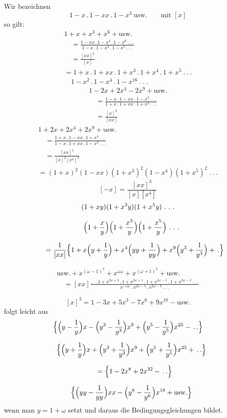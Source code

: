 Wir bezeichnen
\[
1-x\,.\,1-xx\,.\,1-x^3\ \text{usw.}\qquad\text{mit }[x]
\]
so gilt:
\[
\begin{gathered}
1+x+x^3+x^6+\text{usw.}
\\[7pt]\quad{}=\frac{1-xx\,.\,1-x^4\,.\,1-x^6\ .\ .\ .}{1-x\,.\,1-x^3\,.\,1-x^5\ .\ .\ .}\\[7pt]\quad{}=\frac{[xx]^2}{[x]}\\[7pt]
=1+x\,.\,1+xx\,.\,1+x^3\,.\,1+x^4\,.\,1+x^5\ .\ .\ .\\[7pt]\quad{}1-x^2\,.\,1-x^4\,.\,1-x^{16}\ .\ .\ .
\end{gathered}
\]
\[
\begin{gathered}1-2x+2x^4-2x^9+\text{usw.}
\\[7pt]\quad{}=\frac{1-x\,.\,1-xx\,.\,1-x^3\ .\ .\ .}{1+x\,.\,1+xx\,.\,1+x^3\ .\ .\ .}\\[7pt]\quad{}=\frac{[x]^2}{[xx]}\end{gathered}
\]
\[
\begin{gathered}
1+2x+2x^4+2x^9+\text{usw.}
\\[7pt]\quad{}=\frac{1+x\,.\,1-xx\,.\,1+x^3\ .\ .\ .}{1-x\,.\,1+xx\,.\,1-x^3\ .\ .\ .}\\[7pt]\quad{}=\frac{[xx]^5}{[x]^2[x^4]^2}\\[7pt]
=(1+x)^2(1-xx)(1+x^3)^2(1-x^4)(1+x^5)^2\ .\ .\ .
\end{gathered}
\]
\[
[-x]=\frac{[xx]^3}{[x][x^4]}
\]
\[
\begin{gathered}
(1+xy)(1+x^3y)(1+x^5y)\ .\ .\ .
\\[7pt]\quad{}\Bigl(1+\frac{x}{y}\Bigr)\Bigl(1+\frac{x^3}{y}\Bigr)\Bigl(1+\frac{x^5}{y}\Bigr)\ .\ .\ .\\[7pt]
\qquad=\frac{1}{[xx]}\Bigl\{1+x\Bigl(y+\frac{1}{y}\Bigr)+x^4\Bigl(yy+\frac{1}{yy}\Bigr)+x^9\Bigl(y^3+\frac{1}{y^3}\Bigr)+\,.\Bigr\}
\end{gathered}
\]

\[
\begin{gathered}\text{usw.}+x^{(\omega-1)^2}+x^{\omega\omega}+x^{(\omega+1)^2}+\text{usw.}
\\[7pt]\quad{}=[xx]\frac{\ .\ .\ .1+x^{2\omega+3}\,.\,1+x^{2\omega+1}\,.\,1+x^{2\omega-1}\,.\,1+x^{2\omega-3}\ .\ .\ .}{x^{-\omega\omega}\,.\,x^{2\omega-1}\,.\,x^{2\omega-3}\ .\ .\ .}\end{gathered}
\]

\[
[x]^3=1-3x+5x^3-7x^6+9x^{10}-\text{usw.}
\]
folgt leicht aus
\[
\begin{gathered}
\Bigl\{\Bigl(y-\frac{1}{y}\Bigr)x-\Bigl(y^3-\frac{1}{y^3}\Bigr)x^9+\Bigl(y^5-\frac{1}{y^5}\Bigr)x^{25}-\,.\,.\Bigr\}
\\[7pt]\quad{}\Bigl\{\Bigl(y+\frac{1}{y}\Bigr)x+\Bigl(y^3+\frac{1}{y^3}\Bigr)x^9+\Bigl(y^5+\frac{1}{y^5}\Bigr)x^{25}+\,.\,.\Bigr\}\\[7pt]
\qquad=\Bigl\{1-2x^8+2x^{32}-\,.\,.\Bigr\}
\\[7pt]\quad{}\Bigl\{\Bigl(yy-\frac{1}{yy}\Bigr)xx-\Bigl(y^6-\frac{1}{y^6}\Bigr)x^{18}+\text{usw.}\Bigr\}
\end{gathered}
\]
wenn man \(y=1+\omega\) setzt und daraus die Bedingungsgleichungen bildet.
\clearpage
\endgroup
